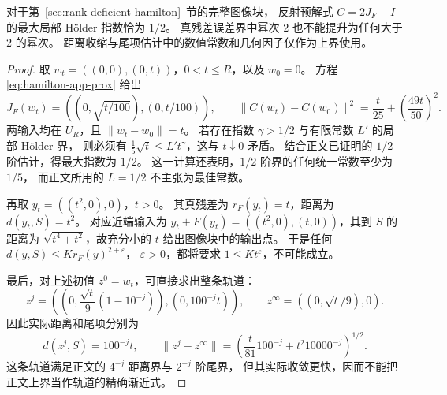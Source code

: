 \begin{proposition}[指数的最优性与上界的保守性]
\label{prop:hamilton-sharp-exponents}
对于第~\ref{sec:rank-deficient-hamilton}~节的完整图像块，
反射预解式 $C=2J_F-I$ 的最大局部 Hölder 指数恰为 $1/2$。
真残差误差界中幂次 $2$ 也不能提升为任何大于 $2$ 的幂次。
距离收缩与尾项估计中的数值常数和几何因子仅作为上界使用。
\end{proposition}

\begin{proof}
取 $w_t=((0,0),(0,t))$，$0<t\leq R$，以及 $w_0=0$。
方程 \eqref{eq:hamilton-app-prox} 给出
\[
 J_F(w_t)=((0,\sqrt{t/100}),(0,t/100)),\qquad
 \|C(w_t)-C(w_0)\|^2=\frac{t}{25}+\left(\frac{49t}{50}\right)^2.
\]
两输入均在 $U_R$，且 $\|w_t-w_0\|=t$。
若存在指数 $\gamma>1/2$ 与有限常数 $L'$ 的局部 Hölder 界，
则必须有
$\frac15\sqrt t\leq L't^\gamma$，这与 $t\downarrow0$ 矛盾。
结合正文已证明的 $1/2$ 阶估计，得最大指数为 $1/2$。
这一计算还表明，$1/2$ 阶界的任何统一常数至少为 $1/5$，
而正文所用的 $L=1/2$ 不主张为最佳常数。

再取 $y_t=((t^2,0),0)$，$t>0$。
其真残差为 $r_F(y_t)=t$，距离为 $d(y_t,S)=t^2$。
对应近端输入为 $y_t+F(y_t)=((t^2,0),(t,0))$，其到 $S$
的距离为 $\sqrt{t^4+t^2}$，故充分小的 $t$ 给出图像块中的输出点。
于是任何 $d(y,S)\leq K r_F(y)^{2+\varepsilon}$，
$\varepsilon>0$，都将要求 $1\leq Kt^\varepsilon$，不可能成立。

最后，对上述初值 $z^0=w_t$，可直接求出整条轨道：
\[
 z^j=\left(
      \left(0,\frac{\sqrt t}{9}(1-10^{-j})\right),
      (0,100^{-j}t)\right),\qquad
 z^\infty=((0,\sqrt t/9),0).
\]
因此实际距离和尾项分别为
\[
 d(z^j,S)=100^{-j}t,\qquad
 \|z^j-z^\infty\|
 =\left(\frac{t}{81}100^{-j}+t^2 10000^{-j}\right)^{1/2}.
\]
这条轨道满足正文的 $4^{-j}$ 距离界与 $2^{-j}$ 阶尾界，
但其实际收敛更快，因而不能把正文上界当作轨道的精确渐近式。
\end{proof}
